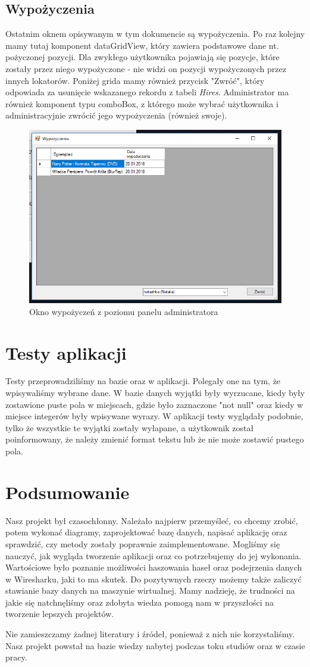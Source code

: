 \documentclass{article}
\begin{document}
\subsection{Wypożyczenia}
Ostatnim oknem opisywanym w tym dokumencie są wypożyczenia. Po raz kolejny mamy tutaj komponent dataGridView, który zawiera podstawowe dane nt. pożyczonej pozycji. Dla zwykłego użytkownika pojawiają się pozycje, które zostały przez niego wypożyczone - nie widzi on pozycji wypożyczonych przez innych lokatorów. Poniżej grida mamy również przycisk "Zwróć", który odpowiada za usunięcie wskazanego rekordu z tabeli \textit{Hires}. Administrator ma również komponent typu comboBox, z którego może wybrać użytkownika i administracyjnie zwrócić jego wypożyczenia (również swoje). 
\begin{figure}[!ht]
\centering
\includegraphics[width=14cm]{hires.PNG}
\caption{Okno wypożyczeń z poziomu panelu administratora}
\end{figure}
\section{Testy aplikacji}
Testy przeprowadziliśmy na bazie oraz w aplikacji. Polegały one na tym, że wpisywaliśmy wybrane dane.
W bazie danych wyjątki były wyrzucane, kiedy były zostawione puste pola w miejscach, gdzie było zaznaczone "not null" oraz kiedy w miejsce integerów były wpisywane wyrazy. 
W aplikacji testy wyglądały podobnie, tylko że wszystkie te wyjątki zostały wyłapane, a użytkownik został poinformowany, że należy zmienić format tekstu lub że nie może zostawić pustego pola.
\section{Podsumowanie}
Nasz projekt był czasochłonny. Należało najpierw przemyśleć, co chcemy zrobić, potem wykonać diagramy, zaprojektować bazę danych, napisać aplikację oraz sprawdzić, czy metody zostały poprawnie zaimplementowane.
	Mogliśmy się nauczyć, jak wygląda tworzenie aplikacji oraz co potrzebujemy do jej wykonania.
	Wartościowe było poznanie możliwości haszowania haseł oraz podejrzenia danych w Wiresharku, jaki to ma skutek.
	Do pozytywnych rzeczy możemy także zaliczyć stawianie bazy danych na maszynie wirtualnej.
	Mamy nadzieję, że trudności na jakie się natchnęliśmy oraz zdobyta wiedza pomogą nam w przyszłości na tworzenie lepszych projektów. 
	
	Nie zamieszczamy żadnej literatury i źródeł, ponieważ z nich nie korzystaliśmy. Nasz projekt powstał na bazie wiedzy nabytej podczas toku studiów oraz w czasie pracy.
\end{document}
